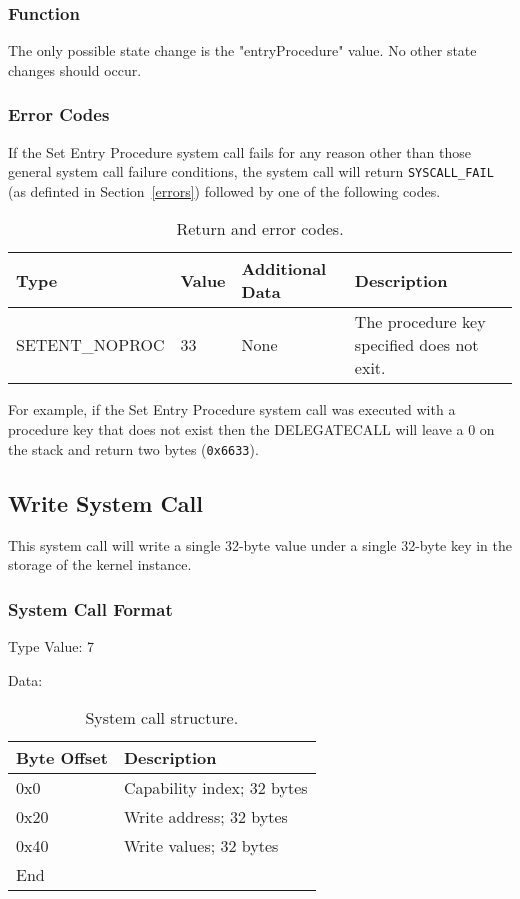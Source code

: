 \documentclass[english,a4paper]{article}
\let\oldparagraph\subsubsection
\renewcommand{\subsubsection}[1]{\oldparagraph{#1}\mbox{}}
\begin{document}
\subsubsection{Function}
The only possible state change is the "entryProcedure" value. No other state
changes should occur.

\subsubsection{Error Codes}
If the Set Entry Procedure system call fails for any reason other than those
general system call failure conditions, the system call will return
\texttt{SYSCALL\_FAIL} (as definted in Section~\ref{errors}) followed by one of
the following codes.

\begin{table}[H]
  \caption{Return and error codes.}
  \centering{}%
  \begin{tabular}{l|l|p{}|p{}}
    \hline
    Type & Value & Additional Data & Description\tabularnewline
    \hline
    \hline
    SETENT\_NOPROC  & 33 & None & The procedure key specified does not exit.
      \tabularnewline
    \hline
  \end{tabular}
\end{table}

For example, if the Set Entry
Procedure system call was executed with a procedure key that does not exist then
the DELEGATECALL will leave a 0 on the stack and return two bytes
(\texttt{0x6633}).

\subsection{Write System Call}
This system call will write a single 32-byte value under a single 32-byte key in
the storage of the kernel instance.

\subsubsection{System Call Format}
Type Value: 7

Data:

\begin{table}[H]
  \caption{System call structure.}
  \centering{}%
  \begin{tabular}{l|p{}}
    \hline
    Byte Offset & Description\tabularnewline
    \hline
    \hline
    0x0 & Capability index; 32 bytes \tabularnewline
    0x20 & Write address; 32 bytes \tabularnewline
    0x40 & Write values; 32 bytes \tabularnewline
    \hline
    End &  \tabularnewline
    \hline
  \end{tabular}
\end{table}
\end{document}
